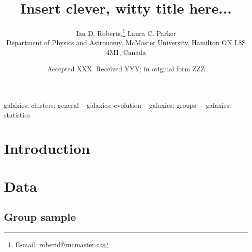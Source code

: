 \documentclass[a4paper,fleqn,usenatbib]{mnras}
\title[]{Insert clever, witty title here...}
\author[I.D. Roberts \& L.C. Parker]{
Ian D. Roberts,\thanks{E-mail: roberid@mcmaster.ca}
Laura C. Parker
\\
Department of Physics and Astronomy, McMaster University, Hamilton ON
L8S 4M1, Canada
}
\date{Accepted XXX. Received YYY; in original form ZZZ}
\begin{document}
\label{firstpage}
\pagerange{\pageref{firstpage}--\pageref{lastpage}}
\maketitle

\begin{abstract}
\end{abstract}

\begin{keywords}
galaxies: clusters: general -- galaxies: evolution -- galaxies:
groups: -- galaxies: statistics
\end{keywords}



\section{Introduction}
\label{sec:introduction}


\section{Data}
\label{sec:data}

\subsection{Group sample}
\end{document}
